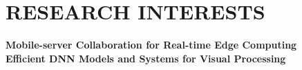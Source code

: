 \section*{RESEARCH INTERESTS}

\textbf{Mobile-server Collaboration for Real-time Edge Computing} \\
\textbf{Efficient DNN Models and Systems for Visual Processing} \\
